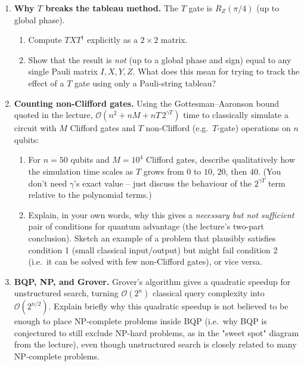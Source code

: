 \documentclass[11pt]{article}
\begin{document}
\begin{enumerate}[label=\textbf{Exercise \arabic*.}, leftmargin=2.2cm]
\item \textbf{Why $T$ breaks the tableau method.}
The $T$ gate is $R_Z(\pi/4)$ (up to global phase).
\begin{enumerate}[label=(\alph*)]
\item Compute $TXT^\dagger$ explicitly as a $2\times2$ matrix.
\item Show that the result is \emph{not} (up to a global phase and
sign) equal to any single Pauli matrix $I,X,Y,Z$. What does this mean
for trying to track the effect of a $T$ gate using only a Pauli-string
tableau?
\end{enumerate}

\item \textbf{Counting non-Clifford gates.}
Using the Gottesman--Aaronson bound quoted in the lecture,
$\mathcal O\!\left(n^2 + nM + nT\,2^{\gamma T}\right)$ time to classically
simulate a circuit with $M$ Clifford gates and $T$ non-Clifford (e.g.\
$T$-gate) operations on $n$ qubits:
\begin{enumerate}[label=(\alph*)]
\item For $n=50$ qubits and $M=10^4$ Clifford gates, describe
qualitatively how the simulation time scales as $T$ grows from $0$ to
$10$, $20$, then $40$. (You don't need $\gamma$'s exact value -- just
discuss the behaviour of the $2^{\gamma T}$ term relative to the
polynomial terms.)
\item Explain, in your own words, why this gives a \emph{necessary but
not sufficient} pair of conditions for quantum advantage (the lecture's
two-part conclusion). Sketch an example of a problem that plausibly
satisfies condition 1 (small classical input/output) but might fail
condition 2 (i.e.\ it can be solved with few non-Clifford gates), or vice
versa.
\end{enumerate}

\item \textbf{BQP, NP, and Grover.}
Grover's algorithm gives a quadratic speedup for unstructured search,
turning $\mathcal O(2^n)$ classical query complexity into
$\mathcal O(2^{n/2})$. Explain briefly why this quadratic speedup is
not believed to be enough to place NP-complete problems inside BQP
(i.e.\ why BQP is conjectured to still exclude NP-hard problems, as in
the "sweet spot" diagram from the lecture), even though unstructured
search is closely related to many NP-complete problems.

\end{enumerate}
\end{document}

